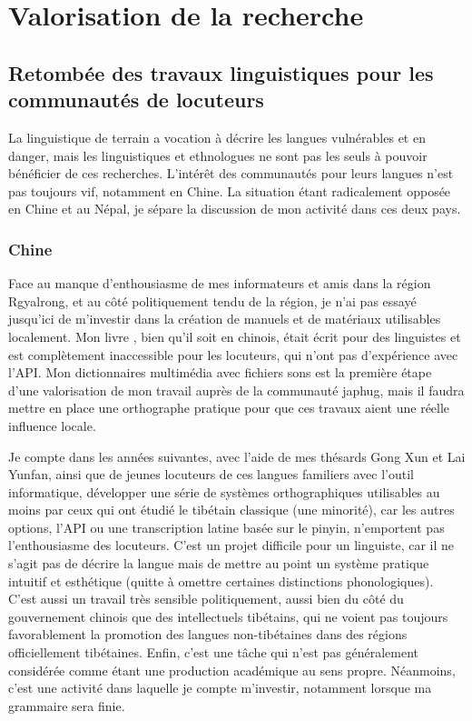 \documentclass[oldfontcommands,oneside,a4paper,11pt]{article}
\begin{document}
\section{Valorisation de la recherche}

\subsection{Retombée des travaux linguistiques pour les communautés de locuteurs}
La linguistique de terrain a vocation à décrire les langues vulnérables et en danger, mais les linguistiques et ethnologues ne sont pas les seuls à pouvoir bénéficier de ces recherches. L'intérêt des communautés pour leurs langues n'est pas toujours vif, notamment en Chine. La situation étant radicalement opposée en Chine et au Népal, je sépare la discussion de mon activité dans ces deux pays.

\subsubsection{Chine}

Face au manque d'enthousiasme de mes informateurs et amis dans la région Rgyalrong, et au côté politiquement tendu de la région, je n'ai pas essayé jusqu'ici de m'investir dans la création de manuels et de matériaux utilisables localement. Mon livre \citet{jacques08zh}, bien qu'il soit en chinois, était écrit pour des linguistes et est complètement inaccessible pour les locuteurs, qui n'ont pas d'expérience avec l'API. Mon dictionnaires multimédia avec fichiers sons est la première étape d'une valorisation de mon travail auprès de la communauté japhug, mais il faudra mettre en place une orthographe pratique pour que ces travaux aient une réelle influence locale.

Je compte dans les années suivantes, avec l'aide de mes thésards Gong Xun et Lai Yunfan, ainsi que de jeunes locuteurs de ces langues familiers avec l'outil informatique, développer une série de systèmes orthographiques utilisables au moins par ceux qui ont étudié le tibétain classique (une minorité), car les autres options, l'API ou une transcription latine basée sur le pinyin, n'emportent pas l'enthousiasme des locuteurs. C'est un projet difficile pour un linguiste, car il ne s'agit pas de décrire la langue mais de mettre au point un système pratique intuitif et esthétique (quitte à omettre certaines distinctions phonologiques). C'est aussi un travail très sensible politiquement, aussi bien du côté du gouvernement chinois que des intellectuels tibétains, qui ne voient pas toujours favorablement la promotion des langues non-tibétaines dans des régions officiellement tibétaines. Enfin, c'est une tâche qui n'est pas généralement considérée comme étant une production académique au sens propre. Néanmoins, c'est une activité dans laquelle je compte m'investir, notamment lorsque ma grammaire sera finie.
\end{document}
